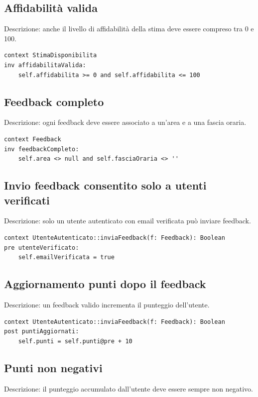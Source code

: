 \documentclass[12pt,a4paper]{article}
\begin{document}
\subsection{Affidabilità valida}
Descrizione: anche il livello di affidabilità della stima deve essere compreso tra 0 e 100.

\begin{verbatim}
context StimaDisponibilita
inv affidabilitaValida:
    self.affidabilita >= 0 and self.affidabilita <= 100
\end{verbatim}

\subsection{Feedback completo}
Descrizione: ogni feedback deve essere associato a un’area e a una fascia oraria.

\begin{verbatim}
context Feedback
inv feedbackCompleto:
    self.area <> null and self.fasciaOraria <> ''
\end{verbatim}

\subsection{Invio feedback consentito solo a utenti verificati}
Descrizione: solo un utente autenticato con email verificata può inviare feedback.

\begin{verbatim}
context UtenteAutenticato::inviaFeedback(f: Feedback): Boolean
pre utenteVerificato:
    self.emailVerificata = true
\end{verbatim}

\subsection{Aggiornamento punti dopo il feedback}
Descrizione: un feedback valido incrementa il punteggio dell’utente.

\begin{verbatim}
context UtenteAutenticato::inviaFeedback(f: Feedback): Boolean
post puntiAggiornati:
    self.punti = self.punti@pre + 10
\end{verbatim}

\subsection{Punti non negativi}
Descrizione: il punteggio accumulato dall’utente deve essere sempre non negativo.
\end{document}
